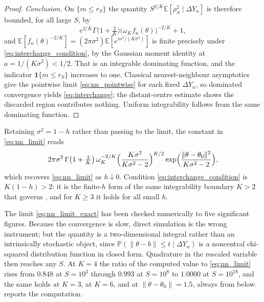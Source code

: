 \documentclass[11pt]{article}
\theoremstyle{definition}
\newcommand{\E}{\mathbb{E}}
\newcommand{\Pp}{\mathbb{P}}
\newcommand{\thetao}{\theta_0}
\begin{document}
\begin{proof}
\emph{Conclusion.} On $\{m\le r_S\}$ the quantity $S^{2/K}\E[\rho_S^2\mid\Delta Y_n]$ is therefore bounded, for all large $S$, by
\[
e^{2/K}\Gamma\bigl(1+\tfrac2K\bigr)\bigl(\omega_Kf_n(\theta)\bigr)^{-2/K}+1 ,
\]
and $\E[f_n(\theta)^{-2/K}]=(2\pi\sigma^2)\E[e^{m^2/(K\sigma^2)}]$ is finite precisely under \eqref{eq:interchange_condition}, by the Gaussian moment identity at $a=1/(K\sigma^2)<1/2$. That is an integrable dominating function, and the indicator $\mathbf{1}\{m\le r_S\}$ increases to one. Classical nearest-neighbour asymptotics give the pointwise limit \eqref{eq:nn_pointwise} for each fixed $\Delta Y_n$, so dominated convergence yields \eqref{eq:interchange}; the distant-centre estimate shows the discarded region contributes nothing. Uniform integrability follows from the same dominating function.
\end{proof}

Retaining $\sigma^2=1-h$ rather than passing to the limit, the constant in \eqref{eq:nn_limit} reads
\begin{equation}\label{eq:nn_limit_exact}
2\pi\sigma^2\,\Gamma\bigl(1+\tfrac2K\bigr)\,\omega_K^{-2/K}
\Bigl(\frac{K\sigma^2}{K\sigma^2-2}\Bigr)^{K/2}
\exp\Bigl(\frac{\lVert\theta-\thetao\rVert^2}{K\sigma^2-2}\Bigr),
\end{equation}
which recovers \eqref{eq:nn_limit} as $h\downarrow0$. Condition \eqref{eq:interchange_condition} is $K(1-h)>2$: it is the finite-$h$ form of the same integrability boundary $K>2$ that governs , and for $K\ge3$ it holds for all small $h$.

The limit \eqref{eq:nn_limit_exact} has been checked numerically to five significant figures. Because the convergence is slow, direct simulation is the wrong instrument; but the quantity is a two-dimensional integral rather than an intrinsically stochastic object, since $\Pp(\lVert\theta-b\rVert\le t\mid\Delta Y_n)$ is a noncentral chi-squared distribution function in closed form. Quadrature in the rescaled variable then reaches any $S$. At $K=4$ the ratio of the computed value to \eqref{eq:nn_limit} rises from $0.848$ at $S=10^3$ through $0.993$ at $S=10^8$ to $1.0000$ at $S=10^{18}$, and the same holds at $K=3$, at $K=6$, and at $\lVert\theta-\thetao\rVert=1.5$, always from below.  reports the computation.
\end{document}

